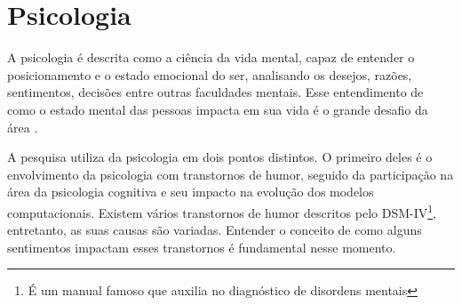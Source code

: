\section{Psicologia}

A psicologia é descrita como a ciência da vida mental, capaz de entender o posicionamento e o estado emocional do ser, analisando os desejos, razões, sentimentos, decisões entre outras faculdades mentais. Esse entendimento de como o estado mental das pessoas impacta em sua vida é o grande desafio da área \cite[4-8]{william1890principles}.

A pesquisa utiliza da psicologia em dois pontos distintos. O primeiro deles é o envolvimento da psicologia com transtornos de humor, seguido da participação na área da psicologia cognitiva e seu impacto na evolução dos modelos computacionais. Existem vários transtornos de humor descritos pelo DSM-IV\footnote{É um manual famoso que auxilia no diagnóstico de disordens mentais\cite{dsmiv}}, entretanto, as suas causas são variadas. Entender o conceito de como alguns sentimentos impactam esses transtornos é fundamental nesse momento.



